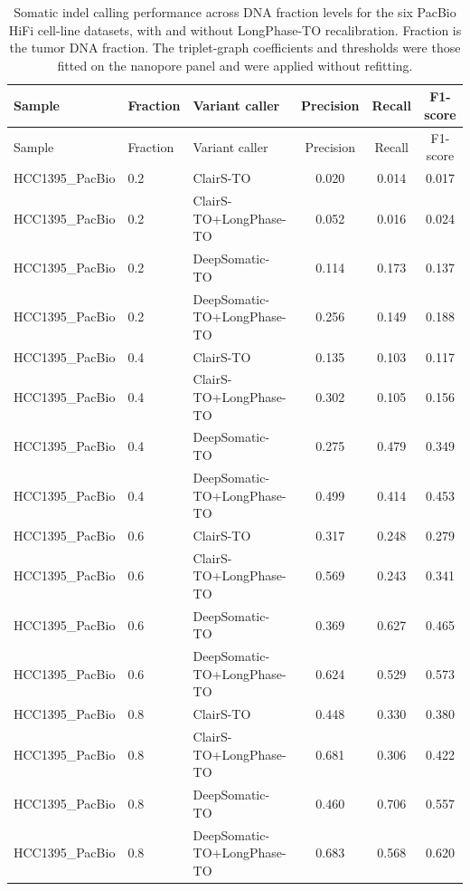 \documentclass[pdflatex,sn-nature]{sn-jnl}
\begin{document}
{\small
\begin{longtable}{@{}lllccc@{}}
  \caption[Somatic indel calling performance on the PacBio HiFi panel]%
  {Somatic indel calling performance across DNA fraction levels for the six PacBio HiFi
  cell-line datasets, with and without LongPhase-TO recalibration. Fraction is the tumor
  DNA fraction. The triplet-graph coefficients and thresholds were those fitted on the
  nanopore panel and were applied without refitting.}
  \label{tab:pacbio_somatic_indel}\\
  \toprule
  Sample & Fraction & Variant caller & Precision & Recall & F1-score \\
  \midrule
  \endfirsthead
  \toprule
  Sample & Fraction & Variant caller & Precision & Recall & F1-score \\
  \midrule
  \endhead
  \bottomrule
  \endlastfoot
  HCC1395\_PacBio & 0.2 & ClairS-TO & 0.020 & 0.014 & 0.017 \\
  HCC1395\_PacBio & 0.2 & ClairS-TO+LongPhase-TO & 0.052 & 0.016 & 0.024 \\
  HCC1395\_PacBio & 0.2 & DeepSomatic-TO & 0.114 & 0.173 & 0.137 \\
  HCC1395\_PacBio & 0.2 & DeepSomatic-TO+LongPhase-TO & 0.256 & 0.149 & 0.188 \\
  HCC1395\_PacBio & 0.4 & ClairS-TO & 0.135 & 0.103 & 0.117 \\
  HCC1395\_PacBio & 0.4 & ClairS-TO+LongPhase-TO & 0.302 & 0.105 & 0.156 \\
  HCC1395\_PacBio & 0.4 & DeepSomatic-TO & 0.275 & 0.479 & 0.349 \\
  HCC1395\_PacBio & 0.4 & DeepSomatic-TO+LongPhase-TO & 0.499 & 0.414 & 0.453 \\
  HCC1395\_PacBio & 0.6 & ClairS-TO & 0.317 & 0.248 & 0.279 \\
  HCC1395\_PacBio & 0.6 & ClairS-TO+LongPhase-TO & 0.569 & 0.243 & 0.341 \\
  HCC1395\_PacBio & 0.6 & DeepSomatic-TO & 0.369 & 0.627 & 0.465 \\
  HCC1395\_PacBio & 0.6 & DeepSomatic-TO+LongPhase-TO & 0.624 & 0.529 & 0.573 \\
  HCC1395\_PacBio & 0.8 & ClairS-TO & 0.448 & 0.330 & 0.380 \\
  HCC1395\_PacBio & 0.8 & ClairS-TO+LongPhase-TO & 0.681 & 0.306 & 0.422 \\
  HCC1395\_PacBio & 0.8 & DeepSomatic-TO & 0.460 & 0.706 & 0.557 \\
  HCC1395\_PacBio & 0.8 & DeepSomatic-TO+LongPhase-TO & 0.683 & 0.568 & 0.620 \\

\end{longtable}}
\end{document}
